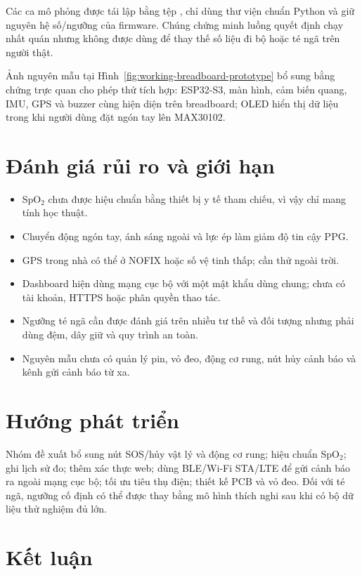 \documentclass[12pt]{article}
\begin{document}
Các ca mô phỏng được tái lập bằng tệp , chỉ dùng thư viện chuẩn Python và giữ nguyên hệ số/ngưỡng của firmware. Chúng chứng minh luồng quyết định chạy nhất quán nhưng không được dùng để thay thế số liệu đi bộ hoặc té ngã trên người thật.

Ảnh nguyên mẫu tại Hình~\ref{fig:working-breadboard-prototype} bổ sung bằng chứng trực quan cho phép thử tích hợp: ESP32-S3, màn hình, cảm biến quang, IMU, GPS và buzzer cùng hiện diện trên breadboard; OLED hiển thị dữ liệu trong khi người dùng đặt ngón tay lên MAX30102.

\section{Đánh giá rủi ro và giới hạn}

\begin{itemize}
  \item SpO$_2$ chưa được hiệu chuẩn bằng thiết bị y tế tham chiếu, vì vậy chỉ mang tính học thuật.
  \item Chuyển động ngón tay, ánh sáng ngoài và lực ép làm giảm độ tin cậy PPG.
  \item GPS trong nhà có thể ở NOFIX hoặc số vệ tinh thấp; cần thử ngoài trời.
  \item Dashboard hiện dùng mạng cục bộ với một mật khẩu dùng chung; chưa có tài khoản, HTTPS hoặc phân quyền thao tác.
  \item Ngưỡng té ngã cần được đánh giá trên nhiều tư thế và đối tượng nhưng phải dùng đệm, dây giữ và quy trình an toàn.
  \item Nguyên mẫu chưa có quản lý pin, vỏ đeo, động cơ rung, nút hủy cảnh báo và kênh gửi cảnh báo từ xa.
\end{itemize}

\section{Hướng phát triển}

Nhóm đề xuất bổ sung nút SOS/hủy vật lý và động cơ rung; hiệu chuẩn SpO$_2$; ghi lịch sử đo; thêm xác thực web; dùng BLE/Wi-Fi STA/LTE để gửi cảnh báo ra ngoài mạng cục bộ; tối ưu tiêu thụ điện; thiết kế PCB và vỏ đeo. Đối với té ngã, ngưỡng cố định có thể được thay bằng mô hình thích nghi sau khi có bộ dữ liệu thử nghiệm đủ lớn.

\section{Kết luận}
\end{document}
